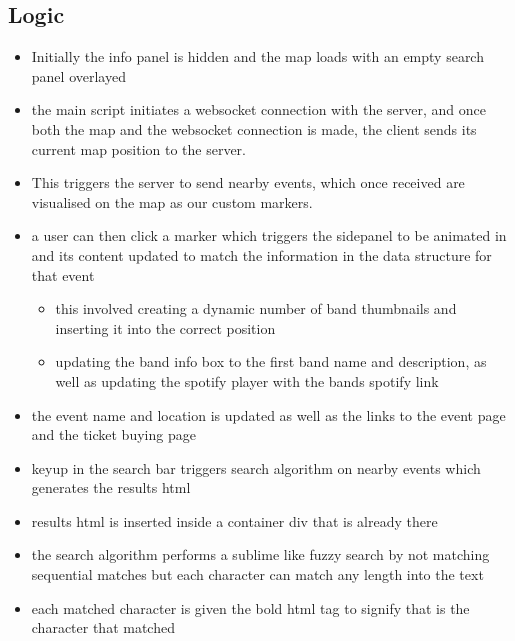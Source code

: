 \documentclass[10pt]{article}
\begin{document}
        \subsection{Logic}
            \begin{itemize}
                \item Initially the info panel is hidden and the map loads with an empty search panel overlayed
                \item the main script initiates a websocket connection with the server, and once both the map and the websocket connection is made, the client sends its current map position to the server.
                \item This triggers the server to send nearby events, which once received are visualised on the map as our custom markers.
                \item a user can then click a marker which triggers the sidepanel to be animated in and its content updated to match the information in the data structure for that event
                \begin{itemize}
                    \item this involved creating a dynamic number of band thumbnails and inserting it into the correct position
                    \item updating the band info box to the first band name and description, as well as updating the spotify player with the bands spotify link
                \end{itemize}
                \item the event name and location is updated as well as the links to the event page and the ticket buying page

                \item keyup in the search bar triggers search algorithm on nearby events which generates the results html
                \item results html is inserted inside a container div that is already there
                \item the search algorithm performs a sublime like fuzzy search by not matching sequential matches but each character can match any length into the text
                \item each matched character is given the bold html tag to signify that is the character that matched
            \end{itemize}
            
\end{document}
